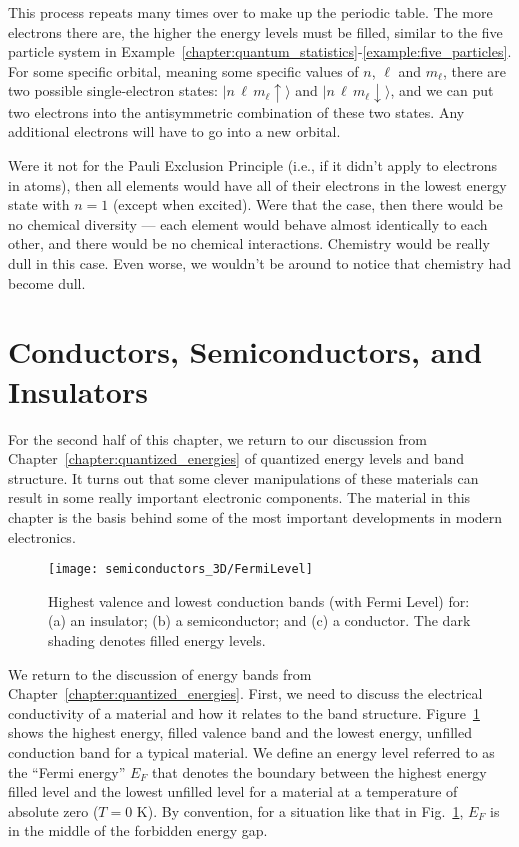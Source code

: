 This process repeats many times over to make up the periodic table.
The more electrons there are, the higher the energy levels must be filled,
similar to the five particle system in Example~\ref{chapter:quantum_statistics}-\ref{example:five_particles}.
For some specific orbital, meaning some specific values of $n$, $\ell$
and $m_\ell$, there are two possible single-electron states:
$|n\,\ell\,m_\ell\uparrow\rangle$ and
$|n\,\ell\,m_\ell\downarrow\rangle$, and we can put two electrons into
the antisymmetric combination of these two states.  Any additional
electrons will have to go into a new orbital.

Were it not for the Pauli Exclusion Principle (i.e., if it didn't apply
to electrons in atoms), then all elements would have all of their
electrons in the lowest energy state with $n = 1$ (except when
excited). Were that the case, then there would be no chemical diversity ---
each element would behave almost identically to each other, and
there would be no chemical interactions. Chemistry would be really dull
in this case. Even worse, we wouldn't be around to notice that chemistry
had become dull.

\section{Conductors, Semiconductors, and Insulators}
\label{sec:conductors_semiconsuctors_insulators}

For the second half of this chapter, we return to our discussion from
Chapter~\ref{chapter:quantized_energies} of quantized energy levels
and band structure. It turns out that some clever manipulations of
these materials can result in some really important electronic
components. The material in this chapter is the basis behind some of
the most important developments in modern electronics.

\begin{figure}
\begin{center}
\texttt{[image: semiconductors\_3D/FermiLevel]}
\end{center}
\caption{Highest valence and lowest conduction bands (with Fermi Level) for:
(a) an insulator; (b) a semiconductor; and (c) a conductor. The dark shading
denotes filled energy levels.}
\label{fig:FermiLevel}
\end{figure}

We return to the discussion of energy bands from 
Chapter~\ref{chapter:quantized_energies}.
First, we need to discuss the electrical conductivity of a material
and how it relates to the band structure. Figure~\ref{fig:FermiLevel}
shows the highest energy, filled valence band and the lowest energy,
unfilled conduction band for a typical material. We define an energy 
level referred to as
the ``Fermi energy'' $E_F$ that denotes the boundary between the
highest energy filled level and the lowest unfilled level for a
material at a temperature of absolute zero ($T = 0$ K). By convention,
for a situation like that in Fig.~\ref{fig:FermiLevel}, $E_F$ is in
the middle of the forbidden energy gap.

